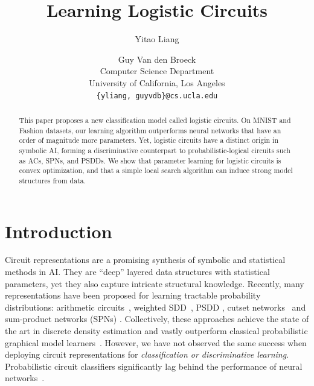 \documentclass[letterpaper]{article} %
\begin{document}
%
\title{Learning Logistic Circuits}
\author{Yitao Liang \and Guy Van den Broeck\\
Computer Science Department\\
University of California, Los Angeles\\
\texttt{\{yliang, guyvdb\}@cs.ucla.edu}\\
}


\maketitle

\begin{abstract}
This paper proposes a new classification model called logistic circuits. On MNIST and Fashion datasets, our learning algorithm outperforms neural networks that have an order of magnitude more parameters. Yet, logistic circuits have a distinct origin in symbolic AI, forming a discriminative counterpart to probabilistic-logical circuits such as ACs, SPNs, and PSDDs.
We show that parameter learning for logistic circuits is convex optimization, and that a simple local search algorithm can induce strong model structures from data.
\end{abstract}

\section{Introduction}
Circuit representations are a promising synthesis of symbolic and statistical methods in AI. They are ``deep'' layered data structures with statistical parameters, yet they also capture intricate structural knowledge.
Recently, many representations have been proposed for learning tractable probability distributions: arithmetic circuits~\cite{lowd:uai08}, weighted SDD~\cite{BekkerNIPS15}, PSDD \cite{KisaVCD14}, cutset networks~\cite{rahman2014cutset} and sum-product networks (SPNs) \cite{poon2011sum}. 
Collectively, these approaches achieve the state of the art in discrete density estimation and vastly outperform classical probabilistic graphical model learners~\cite{gens2013learning,rooshenas2014learning,adel2015learning,rahman2016merging,Liang2017}. However, we have not observed the same success when deploying circuit representations for \emph{classification or discriminative learning}. Probabilistic circuit classifiers significantly lag behind the performance of neural networks~\cite{classificationStanding}.
\end{document}
